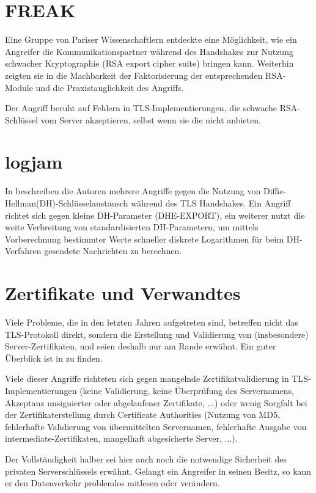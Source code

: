 \section{FREAK}

Eine Gruppe von Pariser Wissenschaftlern entdeckte eine Möglichkeit, wie ein Angreifer die Kommunikationspartner während des Handshakes zur Nutzung schwacher Kryptographie (RSA export cipher suite) bringen kann. Weiterhin zeigten sie in \cite{freak15} die Machbarkeit der Faktorisierung der entsprechenden RSA-Module und die Praxistauglichkeit des Angriffs.

Der Angriff beruht auf Fehlern in TLS-Implementierungen, die schwache RSA-Schlüssel vom Server akzeptieren, selbst wenn sie die \ciphersuites nicht anbieten.

\section{logjam}

In \cite{logjam15} beschreiben die Autoren mehrere Angriffe gegen die Nutzung von Diffie-Hellman(DH)-Schlüsselaustausch während des TLS Handshakes. Ein Angriff richtet sich gegen kleine DH-Parameter (DHE-EXPORT), ein weiterer nutzt die weite Verbreitung von standardisierten DH-Parametern, um mittels Vorberechnung bestimmter Werte schneller diskrete Logarithmen für beim DH-Verfahren gesendete Nachrichten zu berechnen.

\section{Zertifikate und Verwandtes}

Viele Probleme, die in den letzten Jahren aufgetreten sind, betreffen nicht das TLS-Protokoll direkt, sondern die Erstellung und Validierung von (insbesondere) Server-Zertifikaten, und seien deshalb nur am Rande erwähnt. Ein guter Überblick ist in \cite{meyer13} zu finden.

Viele dieser Angriffe richteten sich gegen mangelnde Zertifikatvalidierung in TLS-Implementierungen (keine Validierung, keine Überprüfung des Servernamens, Akzeptanz unsignierter oder abgelaufener Zertifikate, ...) oder wenig Sorgfalt bei der Zertifikaterstellung durch Certificate Authorities (Nutzung von MD5, fehlerhafte Validierung von übermittelten Servernamen, fehlerhafte Ausgabe von intermediate-Zertifikaten, mangelhaft abgesicherte Server, ...).

Der Vollständigkeit halber sei hier auch noch die notwendige Sicherheit des privaten Serverschlüssels erwähnt. Gelangt ein Angreifer in seinen Besitz, so kann er den Datenverkehr problemlos mitlesen oder verändern.
